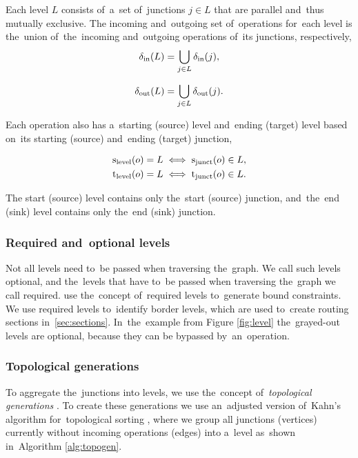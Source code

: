 Each level $L$ consists of~a~set of~junctions $j \in L$ that are parallel and~thus mutually exclusive. The incoming and~outgoing set of~operations for~each level is the~union of~the~incoming and~outgoing operations of~its junctions, respectively,
\begin{equation}
  \operatorname{\delta_{in}}(L) = \bigcup_{j \in L} \operatorname{\delta_{in}}(j),
\end{equation}

\begin{equation}
  \operatorname{\delta_{out}}(L) = \bigcup_{j \in L} \operatorname{\delta_{out}}(j).
\end{equation}

Each operation also has a~starting (source) level and~ending (target) level based on~its starting (source) and~ending (target) junction,

\begin{align}
\operatorname{s}_{\mathrm{level}}(o) &= L \iff \operatorname{s}_{\mathrm{junct}}(o) \in L, \\
\operatorname{t}_{\mathrm{level}}(o) &= L \iff \operatorname{t}_{\mathrm{junct}}(o) \in L.
\end{align}

The start (source) level contains only the~start (source) junction, and~the~end (sink) level contains only the~end (sink) junction.

\subsubsection{Required and~optional levels}
Not all levels need to~be passed when traversing the~graph. We call such levels optional, and the~levels that have to~be passed when traversing the~graph we call required. {\textcite{Dubach2025handling}} use the~concept of~required levels to~generate bound constraints. We use required levels to~identify border levels, which are used to~create routing sections in~\ref{sec:sections}.  In~the~example from Figure \ref{fig:level} the~grayed-out levels are optional, because they can be bypassed by~an~operation.

\subsubsection{Topological generations}
To aggregate the~junctions into levels, we use the~concept of~\emph{topological generations} \cite{Hagberg:2008:NetworkX}. To create these generations we use an~adjusted version of~Kahn's algorithm for~topological sorting \cite{Kahn:1962:Topological}, where we group all junctions (vertices) currently without incoming operations (edges) into a~level as~shown in~Algorithm \ref{alg:topogen}.

